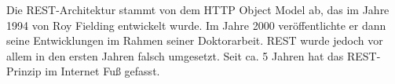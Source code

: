 
Die REST-Architektur stammt von dem HTTP Object Model ab, das im Jahre 1994 von Roy Fielding entwickelt wurde. Im Jahre 2000 veröffentlichte er dann seine Entwicklungen im Rahmen seiner Doktorarbeit. REST wurde jedoch vor allem in den ersten Jahren falsch umgesetzt. Seit ca. 5 Jahren hat das REST-Prinzip im Internet Fuß gefasst. \cite{WikiREST}